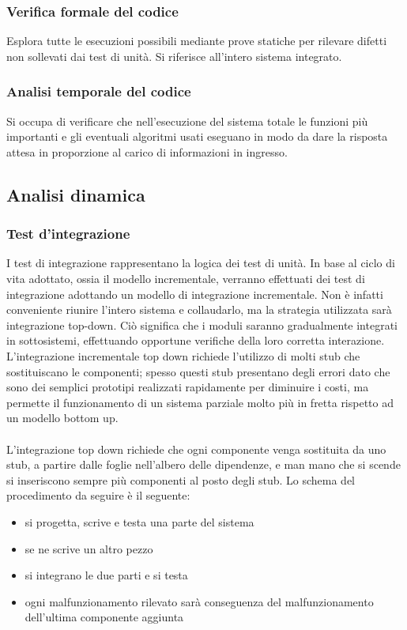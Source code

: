 \subsubsection{Verifica formale del codice}

Esplora tutte le esecuzioni possibili mediante prove statiche per rilevare
difetti non sollevati dai test di unit\`a. Si riferisce all'intero sistema integrato.

\subsubsection{Analisi temporale del codice}

Si occupa di verificare che nell'esecuzione del sistema totale le funzioni pi\`u
importanti e gli eventuali algoritmi usati eseguano in modo da dare la risposta
attesa in proporzione al carico di informazioni in ingresso.

\subsection{Analisi dinamica}
\subsubsection{Test d'integrazione}
I test di integrazione rappresentano la logica dei test di unit\`a.
In base al ciclo di vita adottato, ossia il modello incrementale, verranno effettuati dei 
test di integrazione adottando un modello di integrazione incrementale. 
Non \`e infatti conveniente riunire l'intero sistema e collaudarlo, ma la
strategia utilizzata sar\`a integrazione top-down. Ci\`o significa che i moduli
saranno gradualmente integrati in sottosistemi, effettuando opportune verifiche della loro  corretta interazione. 
L'integrazione incrementale top down richiede l'utilizzo di molti stub che sostituiscano 
le componenti; spesso questi stub presentano degli errori dato che sono dei semplici 
prototipi realizzati rapidamente per diminuire i costi, ma permette il funzionamento di 
un sistema parziale molto pi\`u in fretta rispetto ad un modello bottom up.\\
\\
L'integrazione top down richiede che ogni componente venga sostituita da uno stub, 
a partire dalle foglie nell'albero delle dipendenze, e man mano che si scende si 
inseriscono sempre pi\`u componenti al posto degli stub. 
Lo schema del procedimento da seguire \`e il seguente:

\begin{itemize}
  \item si progetta, scrive e testa una parte del sistema
  \item se ne scrive un altro pezzo
  \item si integrano le due parti e si testa
  \item ogni malfunzionamento rilevato sar\`a conseguenza del malfunzionamento
  dell'ultima componente aggiunta
\end{itemize}


